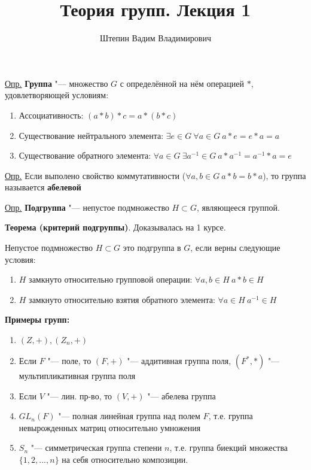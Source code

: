 \documentclass{article}
\title{Теория групп. Лекция 1}
\author{Штепин Вадим Владимирович}
\date{\DTMdate{2019-09-05}}
\begin{document}
\maketitle
\underline{Опр.} \textbf{Группа} "--- множество $G$ с определённой на нём операцией $*$, удовлетворяющей условиям:
\begin{enumerate}
	\item Ассоциативность: $(a*b)*c = a*(b*c)$
	\item Существование нейтрального элемента: $\exists e \in G \ \forall a \in G \  a*e = e*a = a$
	\item Существование обратного элемента: $\forall a \in G \ \exists a^{-1} \in G \ a*a^{-1} = a^{-1}*a = e$
\end{enumerate}

\vspace{10pt}

\underline{Опр.} Если выполено свойство коммутативности ($\forall a, b \in G \  a*b = b*a$), то группа называется \textbf{абелевой}

\vspace{10pt}

\par \underline{Опр.} \textbf{Подгруппа} "--- непустое подмножество $H \subset G$, являющееся группой.

\vspace{10pt}

\textbf{Теорема (критерий подгруппы)}. Доказывалась на 1 курсе.

\par Непустое подмножество $H \subset G$ это подгруппа в $G$, если верны следующие условия:
\begin{enumerate}
	\item $H$ замкнуто относительно групповой операции: $\forall a, b \in H \  a*b \in H$
	\item $H$ замкнуто относительно взятия обратного элемента: $\forall a \in H \  a^{-1} \in H$
\end{enumerate}

\vspace{10pt}

\textbf{Примеры групп:}
\begin{enumerate}
	\item $(Z, +), (Z_n, +)$
	\item Если $F$ "--- поле, то $(F, +)$ "--- аддитивная группа поля, $(F^*, *)$ "--- мультипликативная группа поля
	\item Если $V$ "--- лин. пр-во, то $(V, +)$ "--- абелева группа
	\item $GL_n(F)$ "--- полная линейная группа над полем $F$, т.е. группа невырожденных матриц относительно умножения
	\item $S_n$ "--- симметрическая группа степени $n$, т.е. группа биекций множества $\{1,2, ... , n\}$ на себя относительно композиции.
\end{enumerate}
\end{document}
